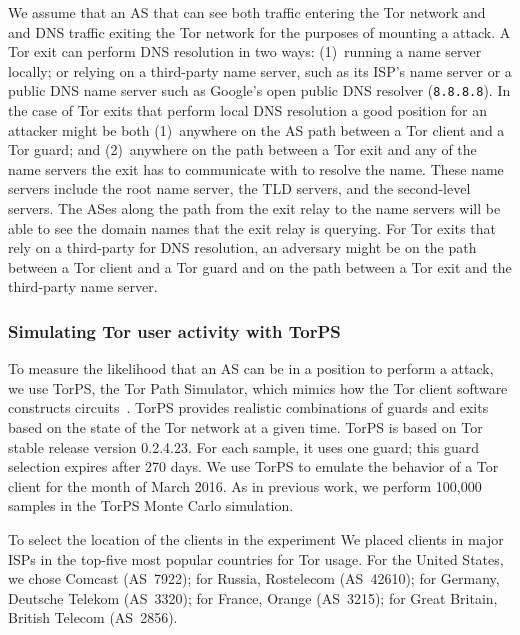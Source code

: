 We assume that an AS that can see both traffic entering the Tor network and
and DNS traffic exiting the Tor network for the purposes of mounting
a \name attack. 
A Tor exit can perform DNS resolution in two ways: (1)~running a name server
locally; or relying on a third-party name server, such as its ISP's name
server or a public DNS name server such as Google's open public DNS
resolver ({\tt 8.8.8.8}).  In the case of Tor
exits that perform local DNS resolution a good position for an attacker
might be both (1)~anywhere on the AS path between a Tor client and a Tor
guard; and (2)~anywhere on the path between a Tor exit and any of the
name servers the exit has to communicate with to resolve the name.
These name servers include the root name server, the TLD servers, and
the second-level servers.  The ASes along the path from the exit relay
to the name servers will be able to see the domain names that the exit
relay is querying.
For Tor exits that rely on a third-party for DNS resolution, an
adversary might be on the path between a Tor client and a
Tor guard and on the path between a Tor exit and the third-party name
server.  

\subsubsection{Simulating Tor user activity with TorPS}

To measure the likelihood that an AS can be in a position to perform a
\name attack, we use TorPS, the Tor Path Simulator, which mimics how the
Tor client software constructs circuits~\cite{TorPS}.  TorPS provides realistic
combinations of guards and exits based on the state of the Tor network
at a given time. TorPS is based on Tor stable release version 0.2.4.23. 
For each sample, 
it uses one guard; this guard selection expires after 270 days. We use TorPS to emulate
the behavior of a Tor client for the month of March 2016.  As in
previous work, we perform 100,000 samples in the TorPS Monte Carlo
simulation.  

To select the location of the clients in the experiment We placed
clients in major ISPs in the top-five most popular countries for Tor
usage. For the United States, we chose Comcast (AS~7922); for Russia,
Rostelecom (AS~42610); for Germany, Deutsche Telekom (AS~3320); for
France, Orange (AS~3215); for Great Britain, British Telecom (AS~2856).

